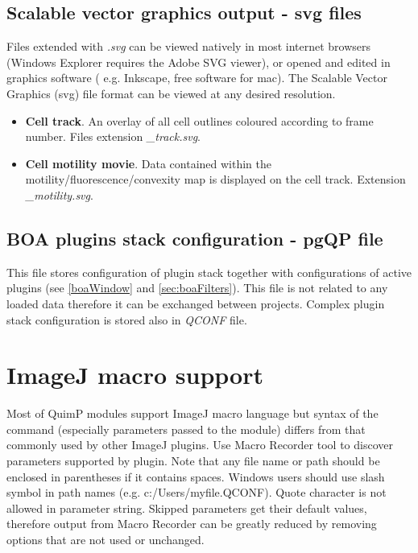 \documentclass[a4paper,12pt]{article}
\begin{document}
\subsection{Scalable vector graphics output - svg files}

Files extended with
\textit{.svg} can be viewed natively in most internet browsers (Windows Explorer requires the Adobe SVG viewer), or opened and edited
in graphics software ( e.g. Inkscape, free software for mac).  The 
Scalable Vector Graphics (svg) file format can be viewed at any desired resolution. 

\begin{itemize}

\item \textbf{Cell track}.  An overlay of all cell outlines coloured according to frame number. Files extension \textit{\_track.svg}.

\item \textbf{Cell motility movie}.  Data contained within the motility/fluorescence/convexity map is displayed on the cell track. Extension \textit{\_motility.svg}.

\end{itemize}

\subsection{BOA plugins stack configuration - pgQP file}

This file stores configuration of plugin stack together with configurations of active plugins (see \autoref{boaWindow} and \autoref{sec:boaFilters}). This file is not related to any loaded data therefore it can be exchanged between projects. Complex plugin stack configuration is stored also in \textit{QCONF} file. 



\section{ImageJ macro support}
\label{sec:macrosupport}
Most of QuimP modules support ImageJ macro language but syntax of the command (especially parameters passed to the module) differs from that commonly used by other ImageJ plugins. Use Macro Recorder tool to discover parameters supported by plugin. Note that any file name or path should be enclosed in parentheses if it contains spaces. Windows users should use slash symbol in path names (e.g. c:/Users/myfile.QCONF). Quote character is not allowed in parameter string. Skipped parameters get their default values, therefore output from Macro Recorder can be greatly reduced by removing options that are not used or unchanged. 
\end{document}
